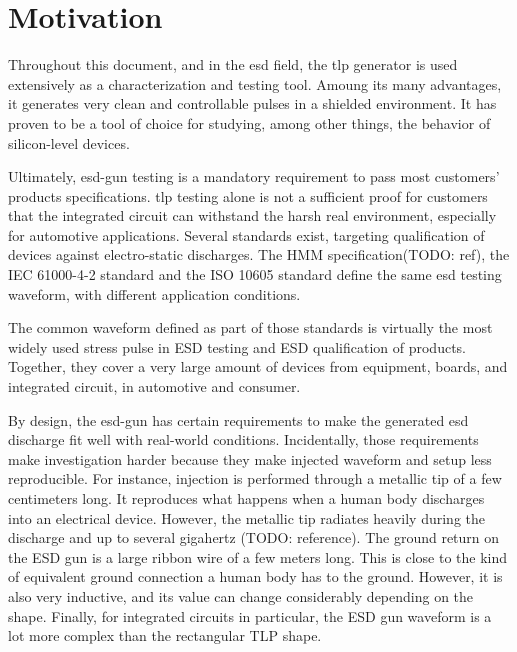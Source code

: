 \section{Motivation}

Throughout this document, and in the \gls{esd} field, the \gls{tlp} generator is used extensively as a characterization and testing tool.
Amoung its many advantages, it generates very clean and controllable pulses in a shielded environment.
It has proven to be a tool of choice for studying, among other things, the behavior of silicon-level devices.

Ultimately, \gls{esd-gun} testing is a mandatory requirement to pass most customers' products specifications.
\gls{tlp} testing alone is not a sufficient proof for customers that the integrated circuit can withstand the harsh real environment, especially for automotive applications.
Several standards exist, targeting qualification of devices against electro-static discharges.
The HMM specification(TODO: ref), the IEC 61000-4-2 standard \cite{iec61000-4-2} and the ISO 10605 standard \cite{iso10605} define the same \gls{esd} testing waveform, with different application conditions.

The common waveform defined as part of those standards is virtually the most widely used stress pulse in ESD testing and ESD qualification of products.
Together, they cover a very large amount of devices from equipment, boards, and integrated circuit, in automotive and consumer.

By design, the \gls{esd-gun} has certain requirements to make the generated \gls{esd} discharge fit well with real-world conditions.
Incidentally, those requirements make investigation harder because they make injected waveform and setup less reproducible.
For instance, injection is performed through a metallic tip of a few centimeters long.
It reproduces what happens when a human body discharges into an electrical device.
However, the metallic tip radiates heavily during the discharge and up to several gigahertz (TODO: reference).
The ground return on the ESD gun is a large ribbon wire of a few meters long.
This is close to the kind of equivalent ground connection a human body has to the ground.
However, it is also very inductive, and its value can change considerably depending on the shape.
Finally, for integrated circuits in particular, the ESD gun waveform is a lot more complex than the rectangular TLP shape.


